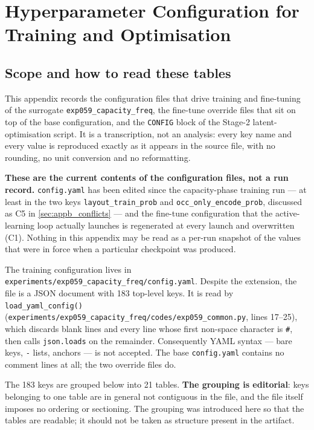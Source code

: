 
\chapter{Hyperparameter Configuration for Training and Optimisation}
\label{ch:appendix_hyperparameters}

\section{Scope and how to read these tables}
\label{sec:appb_scope}

This appendix records the configuration files that drive training and fine-tuning of the
surrogate \texttt{exp059\_capacity\_freq}, the fine-tune override files that sit on top of
the base configuration, and the \texttt{CONFIG} block of the Stage-2 latent-optimisation
script. It is a transcription, not an analysis: every key name and every value is
reproduced exactly as it appears in the source file, with no rounding, no unit
conversion and no reformatting.

\textbf{These are the current contents of the configuration files, not a run record.}
\texttt{config.yaml} has been edited since the capacity-phase training run --- at least in
the two keys \texttt{layout\_train\_prob} and \texttt{occ\_only\_encode\_prob}, discussed
as C5 in \autoref{sec:appb_conflicts} --- and the fine-tune configuration that the
active-learning loop actually launches is regenerated at every launch and overwritten
(C1). Nothing in this appendix may be read as a per-run snapshot of the values that were
in force when a particular checkpoint was produced.

The training configuration lives in \texttt{experiments/exp059\_capacity\_freq/config.yaml}.
Despite the extension, the file is a JSON document with 183 top-level keys. It is read by
\texttt{load\_yaml\_config()} (\texttt{experiments/exp059\_capacity\_freq/codes/exp059\_common.py},
lines 17--25), which discards blank lines and every line whose first non-space character
is \texttt{\#}, then calls \texttt{json.loads} on the remainder. Consequently YAML syntax
--- bare keys, \texttt{-} lists, anchors --- is not accepted. The base \texttt{config.yaml}
contains no comment lines at all; the two override files do.

The 183 keys are grouped below into 21 tables. \textbf{The grouping is editorial}: keys
belonging to one table are in general not contiguous in the file, and the file itself
imposes no ordering or sectioning. The grouping was introduced here so that the tables
are readable; it should not be taken as structure present in the artifact.

